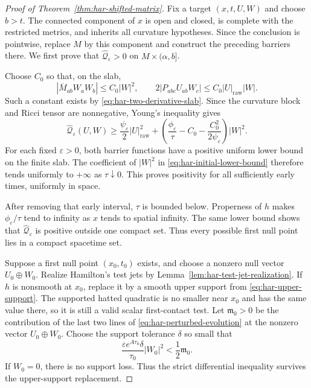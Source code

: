 \documentclass[10pt]{coll-l}
\theoremstyle{definition}
\theoremstyle{remark}
\numberwithin{section}{chapter}
\numberwithin{equation}{chapter}
\begin{document}
\begin{proof}[Proof of Theorem~\ref{thm:har-shifted-matrix}]
Fix a target $(x,t,U,W)$ and choose $b>t$.  The connected component of $x$
is open and closed, is complete with the restricted metrics, and inherits
all curvature hypotheses.  Since the conclusion is pointwise, replace $M$
by this component and construct the preceding barriers there.  We first
prove that $\widehat{\mathscr Q}_\varepsilon>0$ on
$M\times(\alpha,b]$.

Choose $C_0$ so that, on the slab,
\[
 |\overline M_{ab}W_aW_b|\leq C_0|W|^2,
 \qquad
 2|P_{abc}U_{ab}W_c|\leq C_0|U|_{\mathrm{raw}}|W|.
\]
Such a constant exists by \eqref{eq:har-two-derivative-slab}.  Since the
curvature block and Ricci tensor are nonnegative, Young's inequality gives
\begin{equation}
 \widehat{\mathscr Q}_\varepsilon(U,W)
 \geq \frac{\psi_\varepsilon}{2}|U|_{\mathrm{raw}}^2
 +\left(
    \frac{\phi_\varepsilon}{\tau}-C_0
       -\frac{C_0^2}{2\psi_\varepsilon}
  \right)|W|^2.                                        \label{eq:har-initial-lower-bound}
\end{equation}
For each fixed $\varepsilon>0$, both barrier functions have a positive
uniform lower bound on the finite slab.  The coefficient of $|W|^2$ in
\eqref{eq:har-initial-lower-bound} therefore tends uniformly to $+\infty$
as $\tau\downarrow0$.  This proves positivity for all sufficiently early
times, uniformly in space.

After removing that early interval, $\tau$ is bounded below.  Properness of
$h$ makes $\phi_\varepsilon/\tau$ tend to infinity as $x$ tends to spatial
infinity.  The same lower bound shows that
$\widehat{\mathscr Q}_\varepsilon$ is positive outside one compact set.
Thus every possible first null point lies in a compact spacetime set.

Suppose a first null point $(x_0,t_0)$ exists, and choose a nonzero null
vector $U_0\oplus W_0$.  Realize Hamilton's test jets by
Lemma~\ref{lem:har-test-jet-realization}.  If $h$ is nonsmooth at $x_0$,
replace it by a smooth upper support from
\eqref{eq:har-upper-support}.  The supported hatted quadratic is no smaller
near $x_0$ and has the same value there, so it is still a valid scalar
first-contact test.  Let $\mathfrak m_0>0$ be the contribution of the last
two lines of \eqref{eq:har-perturbed-evolution} at the nonzero vector
$U_0\oplus W_0$.  Choose the support tolerance $\delta$ so small that
\begin{equation}
 \frac{\varepsilon e^{A\tau_0}\delta}{\tau_0}|W_0|^2
       <\frac12\mathfrak m_0.                            \label{eq:har-support-loss}
\end{equation}
If $W_0=0$, there is no support loss.  Thus the strict differential
inequality survives the upper-support replacement.


\end{proof}
\end{document}

